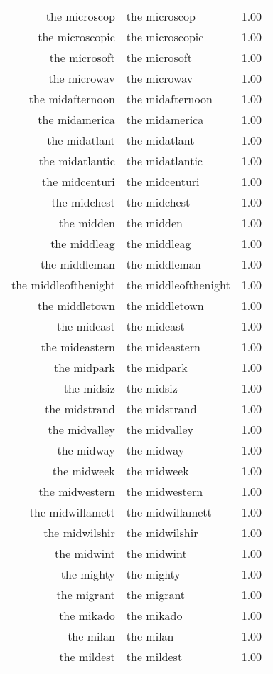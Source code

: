 \begin{table}[ht]
\begin{tabular}{rlr}
  the microscop & the microscop & 1.00 \\ 
  the microscopic & the microscopic & 1.00 \\ 
  the microsoft & the microsoft & 1.00 \\ 
  the microwav & the microwav & 1.00 \\ 
  the midafternoon & the midafternoon & 1.00 \\ 
  the midamerica & the midamerica & 1.00 \\ 
  the midatlant & the midatlant & 1.00 \\ 
  the midatlantic & the midatlantic & 1.00 \\ 
  the midcenturi & the midcenturi & 1.00 \\ 
  the midchest & the midchest & 1.00 \\ 
  the midden & the midden & 1.00 \\ 
  the middleag & the middleag & 1.00 \\ 
  the middleman & the middleman & 1.00 \\ 
  the middleofthenight & the middleofthenight & 1.00 \\ 
  the middletown & the middletown & 1.00 \\ 
  the mideast & the mideast & 1.00 \\ 
  the mideastern & the mideastern & 1.00 \\ 
  the midpark & the midpark & 1.00 \\ 
  the midsiz & the midsiz & 1.00 \\ 
  the midstrand & the midstrand & 1.00 \\ 
  the midvalley & the midvalley & 1.00 \\ 
  the midway & the midway & 1.00 \\ 
  the midweek & the midweek & 1.00 \\ 
  the midwestern & the midwestern & 1.00 \\ 
  the midwillamett & the midwillamett & 1.00 \\ 
  the midwilshir & the midwilshir & 1.00 \\ 
  the midwint & the midwint & 1.00 \\ 
  the mighty & the mighty & 1.00 \\ 
  the migrant & the migrant & 1.00 \\ 
  the mikado & the mikado & 1.00 \\ 
  the milan & the milan & 1.00 \\ 
  the mildest & the mildest & 1.00 \\ 

\end{tabular}
\end{table}
